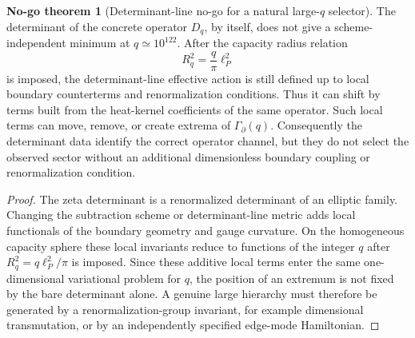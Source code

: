 \documentclass[aps,prd,reprint,nofootinbib,superscriptaddress,floatfix]{revtex4-2}
\numberwithin{equation}{section}
\theoremstyle{definition}
\newtheorem{nogotheorem}{No-go theorem}[section]
\theoremstyle{plain}
\begin{document}
\begin{nogotheorem}[Determinant-line no-go for a natural large-\(q\) selector]
\label{nogo:determinant-alone}
The determinant of the concrete operator \(D_q\), by itself, does not give
a scheme-independent minimum at \(q\simeq10^{122}\).  After the capacity
radius relation
\[
R_q^2=\frac{q}{\pi}\ell_P^2
\]
is imposed, the determinant-line effective action is still defined up to
local boundary counterterms and renormalization conditions.  Thus it can
shift by terms built from the heat-kernel coefficients of the same
operator.  Such local terms can move, remove, or create extrema of
\(\Gamma_\partial(q)\).  Consequently the determinant data identify the
correct operator channel, but they do not select the observed sector
without an additional dimensionless boundary coupling or renormalization
condition.
\end{nogotheorem}

\begin{proof}
The zeta determinant is a renormalized determinant of an elliptic family.
Changing the subtraction scheme or determinant-line metric adds local
functionals of the boundary geometry and gauge curvature.  On the
homogeneous capacity sphere these local invariants reduce to functions of
the integer \(q\) after \(R_q^2=q\ell_P^2/\pi\) is imposed.  Since these
additive local terms enter the same one-dimensional variational problem
for \(q\), the position of an extremum is not fixed by the bare determinant
alone.  A genuine large hierarchy must therefore be generated by a
renormalization-group invariant, for example dimensional transmutation, or
by an independently specified edge-mode Hamiltonian.
\end{proof}
\end{document}
